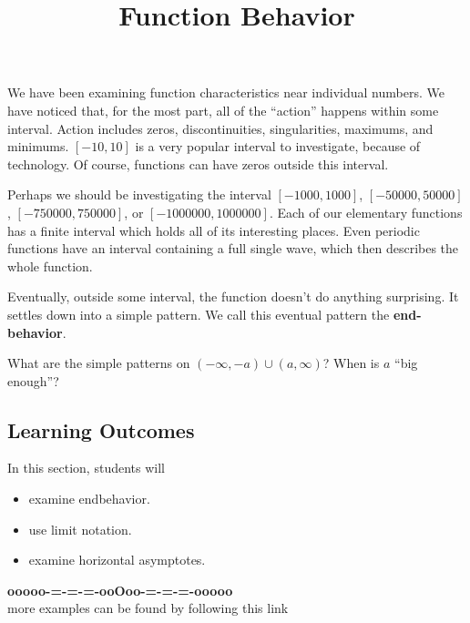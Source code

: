 \documentclass{ximera}
\title{Function Behavior}
\begin{document}
\begin{abstract}
\end{abstract}
\maketitle




We have been examining function characteristics near individual numbers. We have noticed that, for the most part, all of the ``action'' happens within some interval.  Action includes zeros, discontinuities, singularities, maximums, and minimums.  $[-10, 10]$  is a very popular interval to investigate, because of technology.  Of course, functions can have zeros outside this interval.  

Perhaps we should be investigating the interval $[-1000, 1000]$, $[-50000, 50000]$, $[-750000, 750000]$, or $[-1000000, 1000000]$. Each of our elementary functions has a finite interval which holds all of its interesting places.  Even periodic functions have an interval containing a full single wave, which then describes the whole function.

Eventually, outside some interval, the function doesn't do anything surprising.  It settles down into a simple pattern.  We call this eventual pattern the \textbf{\textcolor{purple!85!blue}{end-behavior}}.



What are the simple patterns on $(-\infty, -a) \cup (a, \infty)$?  When is $a$ ``big enough''?








\subsection*{Learning Outcomes}


\begin{sectionOutcomes}
In this section, students will 

\begin{itemize}
\item examine endbehavior.
\item use limit notation.
\item examine horizontal asymptotes.
\end{itemize}
\end{sectionOutcomes}










\begin{center}
\textbf{\textcolor{green!50!black}{ooooo-=-=-=-ooOoo-=-=-=-ooooo}} \\

more examples can be found by following this link\\ 

\end{center}
\end{document}
